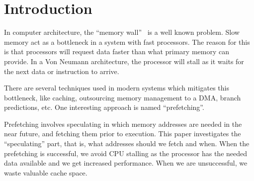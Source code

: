 \section{Introduction}

In computer architecture, the ``memory wall''~\cite{wulf_mckee_1995}
is a well known problem. Slow memory act as a bottleneck in a system
with fast processors. The reason for this is that processors will
request data faster than what primary memory can provide. In a Von
Neumann architecture, the processor
will stall as it waits for the next data or instruction to arrive.

There are several techniques used in modern systems which mitigates
this bottleneck, like caching, outsourcing memory management to a DMA,
branch predictions, etc. One interesting approach is named
``prefetching''.

Prefetching involves speculating in which memory
addresses are needed in the near future, and fetching them prior to
execution. This paper investigates the ``speculating'' part, that is,
what addresses should we fetch and when. When the prefetching is
successful, we avoid CPU stalling as the processor has the needed data
available and we get increased performance. When we are unsuccessful,
we waste valuable cache space.








